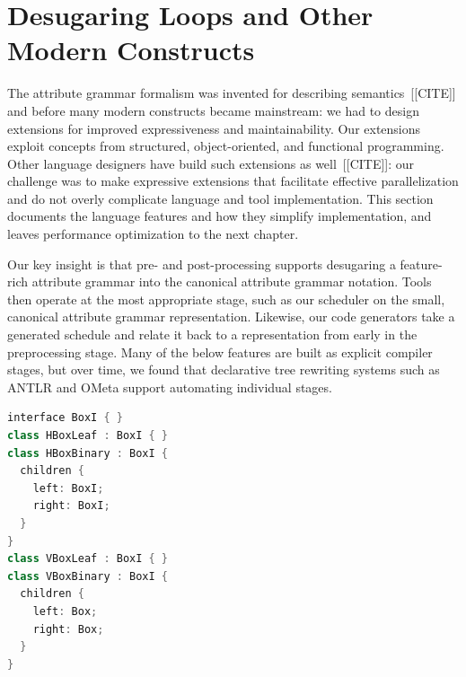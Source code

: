 



\section{Desugaring Loops and Other Modern Constructs}
\label{sec:desugaring}

The attribute grammar formalism was invented for describing semantics~[[CITE]] and before many modern constructs became mainstream: we had to design extensions for improved expressiveness and maintainability. Our extensions exploit concepts from structured, object-oriented, and functional programming. Other language designers have build such extensions as well~[[CITE]]: our challenge was to make expressive extensions that facilitate effective parallelization and do not overly complicate language and tool implementation. This section documents the language features and how they simplify implementation, and leaves performance optimization to the next chapter.

Our key insight is that pre- and post-processing supports desugaring a feature-rich attribute grammar into the canonical attribute grammar notation. Tools then operate at the most appropriate stage, such as our scheduler on the small, canonical attribute grammar representation. Likewise, our code generators take a generated schedule and relate it back to a representation from early in the preprocessing stage. Many of the below features are built as explicit compiler stages, but over time, we found that declarative tree rewriting systems such as ANTLR and OMeta support automating individual stages.



\newsavebox{\ifacegrammar}
\begin{lrbox}{\ifacegrammar}%
\begin{lstlisting}[language=C++,morekeywords={interface,class,children}]
interface BoxI { }
class HBoxLeaf : BoxI { }
class HBoxBinary : BoxI { 
  children {
    left: BoxI;
    right: BoxI;
  }
}
class VBoxLeaf : BoxI { }
class VBoxBinary : BoxI { 
  children {
    left: Box;
    right: Box;
  }
}
\end{lstlisting}
\end{lrbox}




